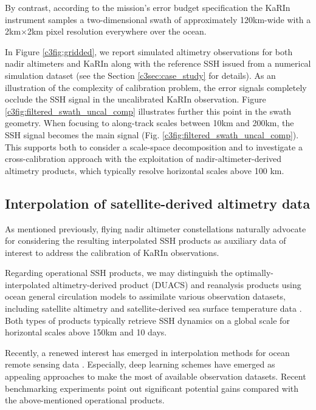 \begin{bibunit}
By contrast, according to the mission's error budget specification \cite{Peral_Esteban-Fernandez_2018} the KaRIn instrument samples a two-dimensional swath of approximately 120km-wide with a 2km$\times$2km pixel resolution everywhere over the ocean.


In Figure \ref{c3fig:gridded}, we report simulated altimetry observations for both nadir altimeters and KaRIn along with the reference SSH issued from a numerical simulation dataset (see  the Section \ref{c3sec:case_study} for details). As an illustration of the complexity of calibration problem, the error signals completely occlude the SSH signal in the uncalibrated KaRIn observation.
Figure \ref{c3fig:filtered_swath_uncal_comp} illustrates further this point in the swath geometry. When focusing to along-track scales between 10km and 200km, the SSH signal becomes the main signal (Fig. \ref{c3fig:filtered_swath_uncal_comp}). This supports
both to consider a scale-space decomposition and to 
investigate a cross-calibration approach with
the exploitation of nadir-altimeter-derived altimetry products, which typically resolve horizontal scales above 100 km.


\subsection{Interpolation of satellite-derived altimetry data}
\label{c3subsec:interpolation}

As mentioned previously, flying nadir altimeter constellations naturally advocate for considering the resulting interpolated SSH products as auxiliary data of interest to address the calibration of KaRIn observations. 

Regarding operational SSH products, we may distinguish the optimally-interpolated altimetry-derived product (DUACS) \cite{taburet_duacs_2019} and reanalysis products using ocean general circulation models to assimilate various observation datasets, including satellite altimetry and satellite-derived sea surface temperature data \cite{glorys_rea_2021}. Both types of products typically retrieve SSH dynamics on a global scale for horizontal scales above 150km and 10 days. 

Recently, a renewed interest has emerged in interpolation methods for ocean remote sensing data \cite{beauchamp_intercomparison_2020}\cite{fablet_end2end_2021}. Especially, deep learning schemes have emerged as appealing approaches to make the most of available observation datasets. Recent benchmarking experiments \cite{osse_data_challenge} point out significant potential gains compared with the above-mentioned operational products.


\end{bibunit}
